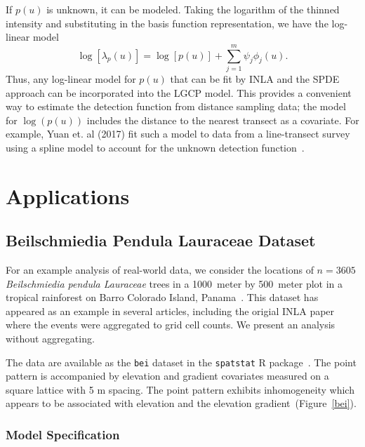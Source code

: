 \documentclass[]{interact}
\begin{document}
If \(p(u)\) is unknown, it can be modeled. Taking the logarithm of
the thinned intensity and substituting in the basis function representation,
we have the log-linear model
\begin{displaymath}
\log\left[\lambda_{p}(u)\right]
= \log\left[p(u)\right] + \sum_{j = 1}^{m} \psi_{j} \phi_{j}(u).
\end{displaymath}
Thus, any log-linear model for \(p(u)\) that can be fit by INLA and the SPDE
approach can be incorporated into the LGCP model. This provides a convenient
way to estimate the detection function from distance sampling data; the model
for \(\log(p(u))\) includes the distance to the nearest transect as a
covariate. For example, Yuan et. al (2017) fit such a model to data from a
line-transect survey using a spline model to account for the unknown detection
function~\cite{yuanetal}.


\section{Applications}
\label{application}


\subsection{Beilschmiedia Pendula Lauraceae Dataset}
\label{beianalysis}

For an example analysis of real-world data, we consider the locations of
\(n = 3605\) \emph{Beilschmiedia pendula Lauraceae} trees in a 1000~meter by
500~meter plot in a tropical rainforest on Barro Colorado Island,
Panama~\cite{moellerwaagepetersen}. This dataset has appeared as an example
in several articles, including the origial INLA paper where the events were
aggregated to grid cell counts. We present an analysis without aggregating.

The data are available as the \texttt{bei} dataset in the \texttt{spatstat} R
package~\cite{spatstat}. The point pattern is accompanied by elevation and
gradient covariates measured on a square lattice with 5 m spacing. The point
pattern exhibits inhomogeneity which appears to be associated with elevation
and the elevation gradient~(Figure~\ref{bei}).


\subsubsection{Model Specification}
\end{document}
